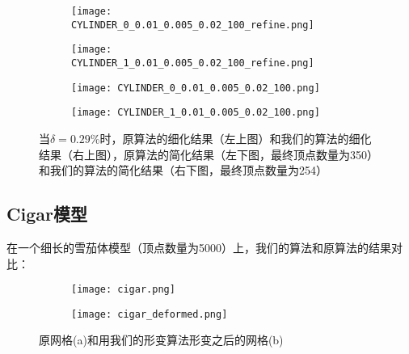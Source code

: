 \begin{figure}[H]
  \centering
  \begin{subfigure}[b]{0.4\textwidth}
    \texttt{[image: CYLINDER\_0\_0.01\_0.005\_0.02\_100\_refine.png]}
  \end{subfigure}
  \begin{subfigure}[b]{0.4\textwidth}
    \texttt{[image: CYLINDER\_1\_0.01\_0.005\_0.02\_100\_refine.png]}
  \end{subfigure}
  \begin{subfigure}[b]{0.4\textwidth}
    \texttt{[image: CYLINDER\_0\_0.01\_0.005\_0.02\_100.png]}
  \end{subfigure}
  \begin{subfigure}[b]{0.4\textwidth}
    \texttt{[image: CYLINDER\_1\_0.01\_0.005\_0.02\_100.png]}
  \end{subfigure}
  \caption[当$\delta=0.29\%$时Cylinder结果对比]{当$\delta=0.29\%$时，原算法的细化结果（左上图）和我们的算法的细化结果（右上图），原算法的简化结果（左下图，最终顶点数量为350）和我们的算法的简化结果（右下图，最终顶点数量为254）}
  \label{fig:cylinder-res2}
\end{figure}


\subsection{Cigar模型}
在一个细长的雪茄体模型（顶点数量为5000）上，我们的算法和原算法的结果对比：
\begin{figure}[H]
  \centering
  \begin{subfigure}[b]{0.4\textwidth}
    \texttt{[image: cigar.png]}
    \end{subfigure}
    \begin{subfigure}[b]{0.4\textwidth}
      \texttt{[image: cigar\_deformed.png]}
    \end{subfigure}
    \caption[cigar形变结果]{原网格(a)和用我们的形变算法形变之后的网格(b)}
    \label{fig:cigar-deform}
\end{figure}


